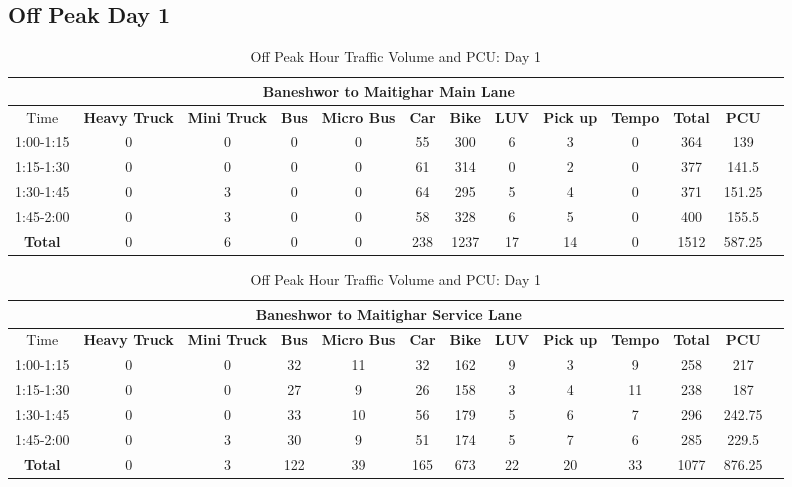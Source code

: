 \begin{landscape}
\centering
\section{Off Peak Day 1}
\begin{table}[h!]
\centering
\caption{Off Peak Hour Traffic Volume and PCU: Day 1}
\begin{tabular}{|c|c|c|c|c|c|c|c|c|c|c|c|c|}
    \hline
    \multicolumn{12}{|c|}{\textbf{Baneshwor to Maitighar Main Lane}} \\
    \hline
        Time & \textbf{Heavy Truck} & \textbf{Mini Truck} & \textbf{Bus} & \textbf{Micro Bus} & \textbf{Car} & \textbf{Bike} & \textbf{LUV} & \textbf{Pick up} & \textbf{Tempo} & \textbf{\textbf{Total}} & \textbf{PCU} \\
    \hline
1:00-1:15	&0	&0	&0	&0	&55	&300	&6	&3	&0	&364	&139 \\ \hline
1:15-1:30	&0	&0	&0	&0	&61	&314	&0	&2	&0	&377	&141.5 \\ \hline
1:30-1:45	&0	&3	&0	&0	&64	&295	&5	&4	&0	&371	&151.25 \\ \hline
1:45-2:00	&0	&3	&0	&0	&58	&328	&6	&5	&0	&400	&155.5 \\ \hline
\textbf{Total}	&0	&6	&0	&0	&238	&1237	&17	&14	&0	&1512	&587.25 \\ \hline

\end{tabular}

\vspace{0.5cm}
\begin{tabular}{|c|c|c|c|c|c|c|c|c|c|c|c|c|}
    \hline
    \multicolumn{12}{|c|}{\textbf{Baneshwor to Maitighar Service Lane}} \\
    \hline
        Time & \textbf{Heavy Truck} & \textbf{Mini Truck} & \textbf{Bus} & \textbf{Micro Bus} & \textbf{Car} & \textbf{Bike} & \textbf{LUV} & \textbf{Pick up} & \textbf{Tempo} & \textbf{\textbf{Total}} & \textbf{PCU} \\
    \hline
1:00-1:15	&0	&0	&32	&11	&32	&162	&9	&3	&9	&258	&217 \\ \hline
1:15-1:30	&0	&0	&27	&9	&26	&158	&3	&4	&11	&238	&187 \\ \hline
1:30-1:45	&0	&0	&33	&10	&56	&179	&5	&6	&7	&296	&242.75 \\ \hline
1:45-2:00	&0	&3	&30	&9	&51	&174	&5	&7	&6	&285	&229.5 \\ \hline
\textbf{Total}	&0	&3	&122	&39	&165	&673	&22	&20	&33	&1077	&876.25 \\ \hline
\end{tabular}

\end{table}
\end{landscape}

